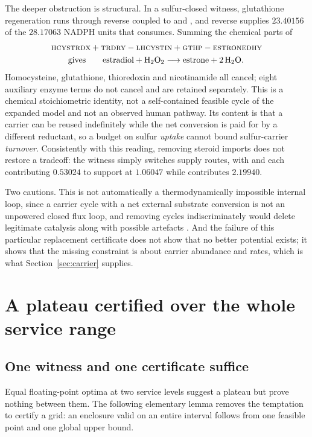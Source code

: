 \documentclass[11pt,a4paper]{article}
\theoremstyle{plain}
\theoremstyle{definition}
\theoremstyle{remark}
\newcommand{\rx}[1]{\textnormal{\textsc{#1}}}
\begin{document}
The deeper obstruction is structural. In a sulfur-closed witness, glutathione
regeneration runs through reverse  coupled to 
and , and reverse  supplies $23.40156$ of the
$28.17063$ NADPH units that  consumes. Summing the chemical parts
of
\begin{equation}\label{eq:identity}
\begin{aligned}
&\rx{hcystrdx}+\rx{trdry}-\rx{lhcystin}+\rx{gthp}-\rx{estronedhy} \\
&\qquad\text{gives}\qquad
\text{estradiol}+\mathrm H_2\mathrm O_2\longrightarrow
\text{estrone}+2\,\mathrm H_2\mathrm O .
\end{aligned}
\end{equation}
Homocysteine, glutathione, thioredoxin and nicotinamide all cancel; eight
auxiliary enzyme terms do not cancel and are retained separately. This is a
chemical stoichiometric identity, not a self-contained feasible cycle of the
expanded model and not an observed human pathway. Its content is that a carrier
can be reused indefinitely while the net conversion is paid for by a different
reductant, so a budget on sulfur \emph{uptake} cannot bound sulfur-carrier
\emph{turnover}. Consistently with this reading, removing steroid imports does
not restore a tradeoff: the witness simply switches supply routes, with
 and  each contributing $0.53024$ to support
 at $1.06047$ while  contributes $2.19940$.

Two cautions. This is not automatically a thermodynamically impossible internal
loop, since a carrier cycle with a net external substrate conversion is not an
unpowered closed flux loop, and removing cycles indiscriminately would delete
legitimate catalysis along with possible artefacts \citep{schellenberger2011}.
And the failure of this particular replacement certificate does not show that
no better potential exists; it shows that the missing constraint is about
carrier abundance and rates, which is what Section~\ref{sec:carrier} supplies.

\section{A plateau certified over the whole service range}\label{sec:plateau}

\subsection{One witness and one certificate suffice}
Equal floating-point optima at two service levels suggest a plateau but prove
nothing between them. The following elementary lemma removes the temptation to
certify a grid: an enclosure valid on an entire interval follows from one
feasible point and one global upper bound.
\end{document}
